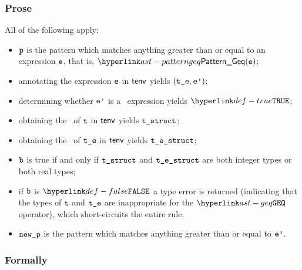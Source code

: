 \subsubsection{Prose}
All of the following apply:
\begin{itemize}
\item $\vp$ is the pattern which matches anything greater than or equal to an expression $\ve$,
that is, $\PatternGeq(\ve)$;
\item annotating the expression $\ve$ in $\tenv$ yields $(\vte, \vep)$\ProseOrTypeError;
\item determining whether $\vep$ is a \staticallyevaluable\ expression yields $\True$\ProseOrTypeError;
\item obtaining the \underlyingtype\ of $\vt$ in $\tenv$ yields $\vtstruct$\ProseOrTypeError;
\item obtaining the \underlyingtype\ of $\vte$ in $\tenv$ yields $\testruct$\ProseOrTypeError;
\item $\vb$ is true if and only if $\vtstruct$ and $\testruct$ are both integer types or both real types;
\item if $\vb$ is $\False$ a type error is returned (indicating that the types of $\vt$ and $\vte$
      are inappropriate for the $\GEQ$ operator),
which short-circuits the entire rule;
\item $\newp$ is the pattern which matches anything greater than or equal to $\vep$.
\end{itemize}
\subsubsection{Formally}
\begin{mathpar}
\end{mathpar}

